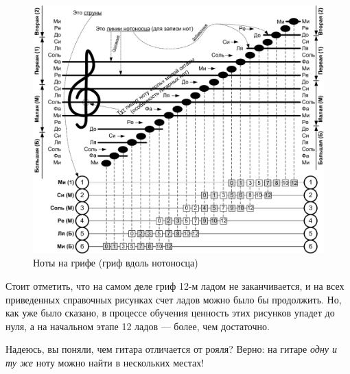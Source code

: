 \begin{figure}[!ht]
    \centering
    \includegraphics[width=\textwidth]{fig/lad-by-griph} 
    \caption{Ноты на грифе (гриф вдоль нотоносца)}\label{fig:guitar:lad-by-griph}
\end{figure} 

Стоит отметить, что на самом деле гриф 12-м ладом не заканчивается, и на всех приведенных справочных рисунках счет ладов можно было бы продолжить. Но, как уже было сказано, в процессе обучения ценность этих рисунков упадет до нуля, а на начальном этапе 12 ладов --- более, чем достаточно.

Надеюсь, вы поняли, чем гитара отличается от рояля? Верно: на гитаре \emph{одну и ту же} ноту можно найти в нескольких местах!


